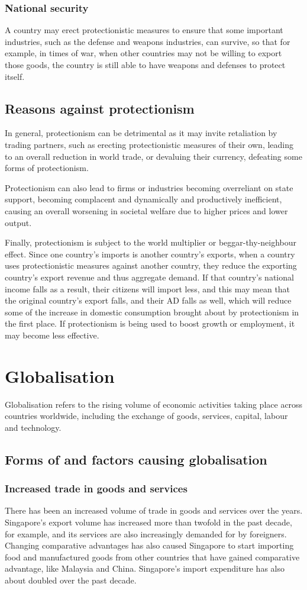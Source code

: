 \documentclass[Economics.tex]{subfiles}
\begin{document}
\subsubsection{National security}
A country may erect protectionistic measures to ensure that some important industries, such as the defense and weapons industries, can survive, so that for example, in times of war, when other countries may not be willing to export those goods, the country is still able to have weapons and defenses to protect itself.
\subsection{Reasons against protectionism}
In general, protectionism can be detrimental as it may invite retaliation by trading partners, such as erecting protectionistic measures of their own, leading to an overall reduction in world trade, or devaluing their currency, defeating some forms of protectionism.

Protectionism can also lead to firms or industries becoming overreliant on state support, becoming complacent and dynamically and productively inefficient, causing an overall worsening in societal welfare due to higher prices and lower output.

Finally, protectionism is subject to the world multiplier or beggar-thy-neighbour effect. Since one country's imports is another country's exports, when a country uses protectionistic measures against another country, they reduce the exporting country's export revenue and thus aggregate demand. If that country's national income falls as a result, their citizens will import less, and this may mean that the original country's export falls, and their AD falls as well, which will reduce some of the increase in domestic consumption brought about by protectionism in the first place. If protectionism is being used to boost growth or employment, it may become less effective.
\section{Globalisation}
Globalisation refers to the rising volume of economic activities taking place across countries worldwide, including the exchange of goods, services, capital, labour and technology.
\subsection{Forms of and factors causing globalisation}
\subsubsection{Increased trade in goods and services}
There has been an increased volume of trade in goods and services over the years. Singapore's export volume has increased more than twofold in the past decade, for example, and its services are also increasingly demanded for by foreigners. Changing comparative advantages has also caused Singapore to start importing food and manufactured goods from other countries that have gained comparative advantage, like Malaysia and China. Singapore's import expenditure has also about doubled over the past decade.
\end{document}
